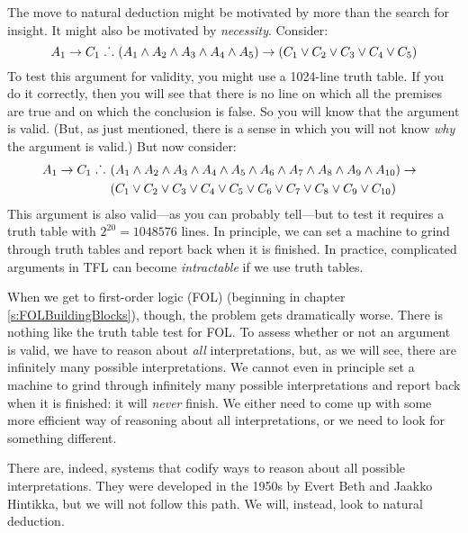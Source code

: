 The move to natural deduction might be motivated by more than the search for insight. It might also be motivated by \emph{necessity}. Consider:
	$$A_1 \rightarrow C_1 \mathrel{\ldotp\dot{}\,\ldotp} (A_1 \wedge A_2 \wedge A_3 \wedge A_4 \wedge A_5) \rightarrow (C_1 \vee C_2 \vee C_3 \vee C_4 \vee C_5)$$
To test this argument for validity, you might use a 1024-line truth table. If you do it correctly, then you will see that there is no line on which all the premises are true and on which the conclusion is false. So you will know that the argument is valid. (But, as just mentioned, there is a sense in which you will not know \emph{why} the argument is valid.) But now consider:
	\begin{align*}
		A_1 \rightarrow C_1 \mathrel{\ldotp\dot{}\,\ldotp}\ & (A_1 \wedge A_2 \wedge A_3 \wedge A_4 \wedge A_5 \wedge A_6 \wedge A_7 \wedge A_8 \wedge A_9 \wedge A_{10}) \rightarrow \phantom{(}\\
				&(C_1 \vee C_2 \vee C_3 \vee C_4 \vee C_5 \vee C_6 \vee C_7 \vee C_8 \vee C_9 \vee C_{10})
	\end{align*}
This argument is also valid---as you can probably tell---but to test it requires a truth table with $2^{20} = 1048576$ lines. In principle, we can set a machine to grind through truth tables and report back when it is finished. In practice, complicated arguments in TFL can become \emph{intractable} if we use truth tables.

When we get to first-order logic (FOL) (beginning in chapter \ref{s:FOLBuildingBlocks}), though, the problem gets dramatically worse. There is nothing like the truth table test for FOL. To assess whether or not an argument is valid, we have to reason about \emph{all} interpretations, but, as we will see, there are infinitely many possible interpretations. We cannot even in principle set a machine to grind through infinitely many possible interpretations and report back when it is finished: it will \emph{never} finish. We either need to come up with some more efficient way of reasoning about all interpretations, or we need to look for something different. 

There are, indeed, systems that codify ways to reason about all possible interpretations. They were developed in the 1950s by Evert Beth and Jaakko Hintikka, but we will not follow this path. We will, instead, look to natural deduction. 
%
%
%

